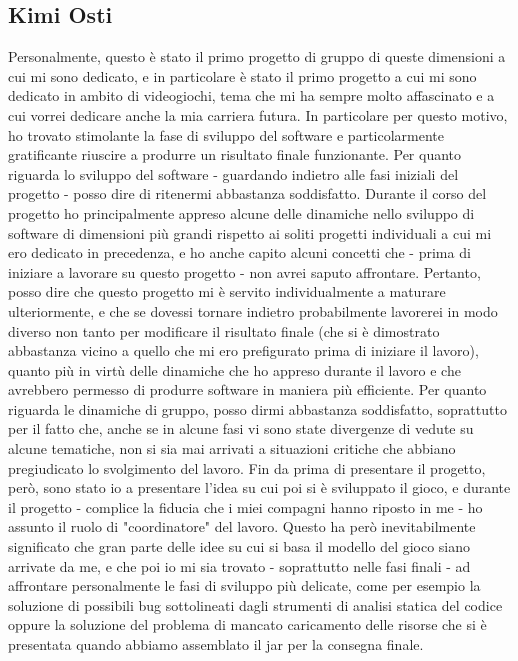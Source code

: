 \documentclass[a4paper,12pt]{report}
\begin{document}
\subsection{Kimi Osti}
Personalmente, questo è stato il primo progetto di gruppo di queste dimensioni a cui mi sono dedicato, e in particolare è stato il primo progetto a cui mi sono dedicato in ambito di videogiochi, tema che mi ha sempre molto affascinato e a cui vorrei dedicare anche la mia carriera futura. In particolare per questo motivo, ho trovato stimolante la fase di sviluppo del software e particolarmente gratificante riuscire a produrre un risultato finale funzionante.
\newline Per quanto riguarda lo sviluppo del software - guardando indietro alle fasi iniziali del progetto - posso dire di ritenermi abbastanza soddisfatto. Durante il corso del progetto ho principalmente appreso alcune delle dinamiche nello sviluppo di software di dimensioni più grandi rispetto ai soliti progetti individuali a cui mi ero dedicato in precedenza, e ho anche capito alcuni concetti che - prima di iniziare a lavorare su questo progetto - non avrei saputo affrontare. Pertanto, posso dire che questo progetto mi è servito individualmente a maturare ulteriormente, e che se dovessi tornare indietro probabilmente lavorerei in modo diverso non tanto per modificare il risultato finale (che si è dimostrato abbastanza vicino a quello che mi ero prefigurato prima di iniziare il lavoro), quanto più in virtù delle dinamiche che ho appreso durante il lavoro e che avrebbero permesso di produrre software in maniera più efficiente.
\newline Per quanto riguarda le dinamiche di gruppo, posso dirmi abbastanza soddisfatto, soprattutto per il fatto che, anche se in alcune fasi vi sono state divergenze di vedute su alcune tematiche, non si sia mai arrivati a situazioni critiche che abbiano pregiudicato lo svolgimento del lavoro. Fin da prima di presentare il progetto, però, sono stato io a presentare l'idea su cui poi si è sviluppato il gioco, e durante il progetto - complice la fiducia che i miei compagni hanno riposto in me - ho assunto il ruolo di "coordinatore" del lavoro. Questo ha però inevitabilmente significato che gran parte delle idee su cui si basa il modello del gioco siano arrivate da me, e che poi io mi sia trovato - soprattutto nelle fasi finali - ad affrontare personalmente le fasi di sviluppo più delicate, come per esempio la soluzione di possibili bug sottolineati dagli strumenti di analisi statica del codice oppure la soluzione del problema di mancato caricamento delle risorse che si è presentata quando abbiamo assemblato il jar per la consegna finale.
\end{document}
